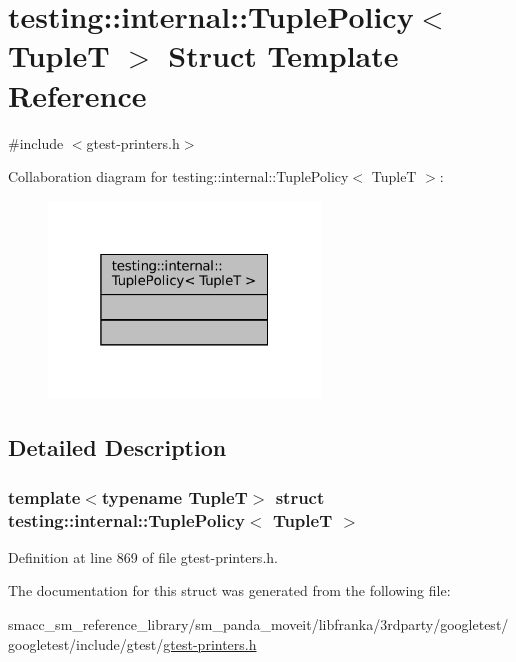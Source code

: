 \hypertarget{structtesting_1_1internal_1_1TuplePolicy}{}\section{testing\+:\+:internal\+:\+:Tuple\+Policy$<$ TupleT $>$ Struct Template Reference}
\label{structtesting_1_1internal_1_1TuplePolicy}


{\ttfamily \#include $<$gtest-\/printers.\+h$>$}



Collaboration diagram for testing\+:\+:internal\+:\+:Tuple\+Policy$<$ TupleT $>$\+:
\nopagebreak
\begin{figure}[H]
\begin{center}
\leavevmode
\includegraphics[width=205pt]{structtesting_1_1internal_1_1TuplePolicy__coll__graph}
\end{center}
\end{figure}


\subsection{Detailed Description}
\subsubsection*{template$<$typename TupleT$>$\newline
struct testing\+::internal\+::\+Tuple\+Policy$<$ Tuple\+T $>$}



Definition at line 869 of file gtest-\/printers.\+h.



The documentation for this struct was generated from the following file\+:\begin{DoxyCompactItemize}
\item 
smacc\+\_\+sm\+\_\+reference\+\_\+library/sm\+\_\+panda\+\_\+moveit/libfranka/3rdparty/googletest/googletest/include/gtest/\hyperlink{gtest-printers_8h}{gtest-\/printers.\+h}\end{DoxyCompactItemize}
